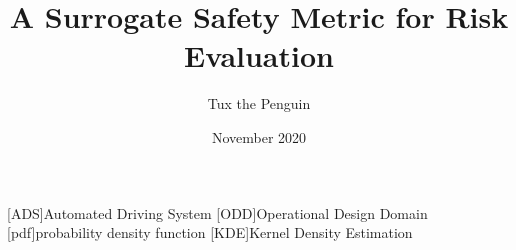 \documentclass{article}
\title{A Surrogate Safety Metric for Risk Evaluation}
\author{Tux the Penguin}
\date{November 2020}
\begin{document}
\begin{acronym}[AAAAAAAA]
	[ADS]{Automated Driving System}
	[ODD]{Operational Design Domain}
	[pdf]{probability density function}
	[KDE]{Kernel Density Estimation}
\end{acronym}

\maketitle











\printbibliography
\end{document}
